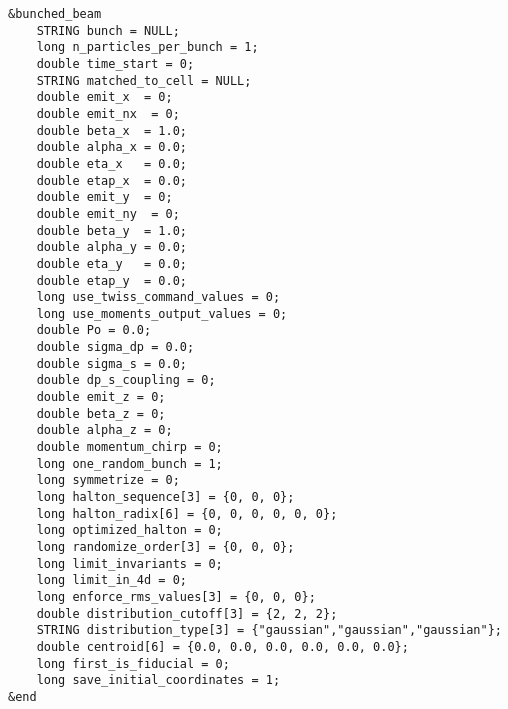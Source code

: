 \documentclass[11pt]{article}
\begin{document}
\begin{verbatim}
&bunched_beam
    STRING bunch = NULL;
    long n_particles_per_bunch = 1;
    double time_start = 0;
    STRING matched_to_cell = NULL;
    double emit_x  = 0;
    double emit_nx  = 0;
    double beta_x  = 1.0;
    double alpha_x = 0.0;
    double eta_x   = 0.0;
    double etap_x  = 0.0;
    double emit_y  = 0;
    double emit_ny  = 0;
    double beta_y  = 1.0;
    double alpha_y = 0.0;
    double eta_y   = 0.0;
    double etap_y  = 0.0;
    long use_twiss_command_values = 0;
    long use_moments_output_values = 0;
    double Po = 0.0;
    double sigma_dp = 0.0;
    double sigma_s = 0.0;
    double dp_s_coupling = 0;
    double emit_z = 0;
    double beta_z = 0;
    double alpha_z = 0;
    double momentum_chirp = 0;
    long one_random_bunch = 1;
    long symmetrize = 0;
    long halton_sequence[3] = {0, 0, 0};
    long halton_radix[6] = {0, 0, 0, 0, 0, 0};
    long optimized_halton = 0;
    long randomize_order[3] = {0, 0, 0};
    long limit_invariants = 0;
    long limit_in_4d = 0;
    long enforce_rms_values[3] = {0, 0, 0};
    double distribution_cutoff[3] = {2, 2, 2};
    STRING distribution_type[3] = {"gaussian","gaussian","gaussian"};
    double centroid[6] = {0.0, 0.0, 0.0, 0.0, 0.0, 0.0};
    long first_is_fiducial = 0;
    long save_initial_coordinates = 1;
&end
\end{verbatim}
\end{document}
